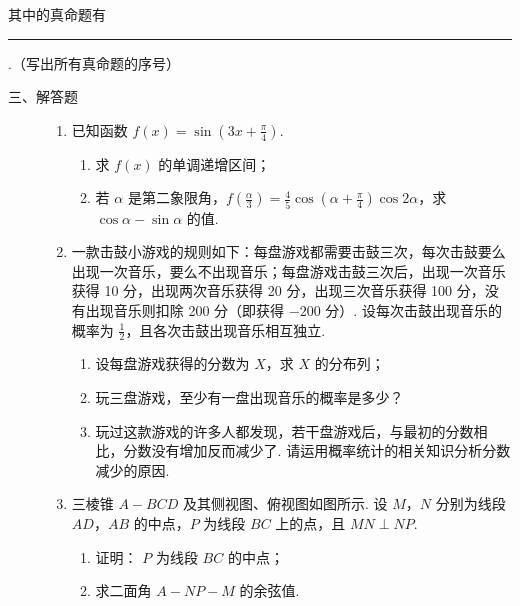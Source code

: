 \begin{description}
\begin{enumerate}[leftmargin=5pt]
其中的真命题有\rule[-0.3ex]{3em}{0.4pt}.（写出所有真命题的序号）

    \end{enumerate}

\end{description}

\begin{description}

    \item[三、解答题]

    \begin{enumerate}[leftmargin=5pt]

      \addtocounter{enumi}{+15}

        \item 已知函数 \( f(x) = \sin \left(3x + \frac{\pi}{4}\right) \).
\begin{enumerate}
\item 求 \( f(x) \) 的单调递增区间；
\item 若 \(\alpha\) 是第二象限角，\(f\left(\frac{\alpha}{3}\right) = \frac{4}{5}\cos \left(\alpha + \frac{\pi}{4}\right)\cos 2\alpha\)，求 \(\cos \alpha - \sin \alpha\) 的值.
\end{enumerate}

        \item 一款击鼓小游戏的规则如下：每盘游戏都需要击鼓三次，每次击鼓要么出现一次音乐，要么不出现音乐；每盘游戏击鼓三次后，出现一次音乐获得 10 分，出现两次音乐获得 20 分，出现三次音乐获得 100 分，没有出现音乐则扣除 200 分（即获得 \(-200\) 分）. 设每次击鼓出现音乐的概率为 \(\frac{1}{2}\)，且各次击鼓出现音乐相互独立.
\begin{enumerate}
\item 设每盘游戏获得的分数为 \(X\)，求 \(X\) 的分布列；
\item 玩三盘游戏，至少有一盘出现音乐的概率是多少？
\item 玩过这款游戏的许多人都发现，若干盘游戏后，与最初的分数相比，分数没有增加反而减少了. 请运用概率统计的相关知识分析分数减少的原因.
\end{enumerate}

        \item 三棱锥 \(A - BCD\) 及其侧视图、俯视图如图所示. 设 \(M\)，\(N\) 分别为线段 \(AD\)，\(AB\) 的中点，\(P\) 为线段 \(BC\) 上的点，且 \(MN \perp NP\).
\begin{enumerate}
\item 证明： \(P\) 为线段 \(BC\) 的中点；
\item 求二面角 \(A - NP - M\) 的余弦值.
\end{enumerate}


\end{enumerate}
\end{description}
